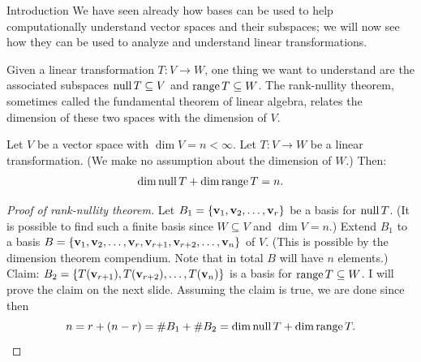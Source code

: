 \begin{frame}{Introduction}
We have seen already how bases can be used to help computationally understand vector spaces and their subspaces; we will now see how they can be used to analyze and understand linear transformations. 

\bspace Given a linear transformation $T\colon V\rightarrow W$, one thing we want to understand are the associated subspaces $\operatorname{null} T\subseteq V$ and $\operatorname{range} T\subseteq W$. The \alert{rank-nullity} theorem, sometimes called the \alert{fundamental theorem of linear algebra}, relates the dimension of these two spaces with the dimension of $V$.   

\end{frame}
\begin{frame}
\begin{theorem}
Let $V$ be a vector space with $\dim V=n<\infty$. Let $T\colon V\rightarrow W$ be a linear transformation. (We make no assumption about the dimension of $W$.) Then: 
\[
\dim\operatorname{null} T+\dim\operatorname{range} T=n.
\]
\end{theorem}
\pause

\pause \begin{proof}[Proof of rank-nullity theorem]
Let  $B_1=\{{\mathbf v}_1,{\mathbf v}_2,\dots, {\mathbf v}_r\}$ be a basis for $\operatorname{null} T$. (It is possible to find such a finite basis since $W\subseteq V$ and $\dim V=n$.)
\bpause
Extend $B_1$ to a basis $B=\{{\mathbf v}_1,{\mathbf v}_2,\dots, {\mathbf v}_r, {\mathbf v}_{r+1},{\mathbf v}_{r+2},\dots, {\mathbf v}_n\}$ of $V$. (This is possible by the dimension theorem compendium. Note that in total $B$ will have $n$ elements.) 
\bpause \alert{Claim}: $B_2=\{T({\mathbf v}_{r+1}), T({\mathbf v}_{r+2}), \dots, T({\mathbf v}_{n})\}$ is a basis for $\operatorname{range} T\subseteq W$. 
\bpause
I will prove the claim on the next slide. Assuming the claim is true, we are done since then 
\[
n=r+(n-r)=\#B_1+\#B_2=\dim\operatorname{null} T+\dim\operatorname{range} T.
\]
\end{proof}
\end{frame}

